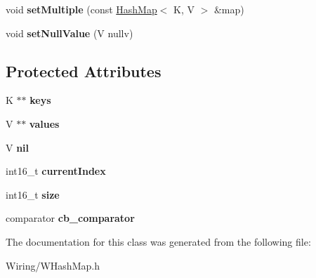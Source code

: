 \begin{DoxyCompactItemize}
\item 
\hypertarget{class_hash_map_ac5a8399ea019f8023bdad58a5c71f129}{}void {\bfseries set\+Multiple} (const \hyperlink{class_hash_map}{Hash\+Map}$<$ K, V $>$ \&map)\label{class_hash_map_ac5a8399ea019f8023bdad58a5c71f129}

\item 
\hypertarget{class_hash_map_acb737f38a458ac98ad1c01400ea8b572}{}void {\bfseries set\+Null\+Value} (V nullv)\label{class_hash_map_acb737f38a458ac98ad1c01400ea8b572}

\end{DoxyCompactItemize}
\subsection*{Protected Attributes}
\begin{DoxyCompactItemize}
\item 
\hypertarget{class_hash_map_a655e048c02f3bdbc0c3f300d5a73ab88}{}K $\ast$$\ast$ {\bfseries keys}\label{class_hash_map_a655e048c02f3bdbc0c3f300d5a73ab88}

\item 
\hypertarget{class_hash_map_a5811d197090726d10507a6189ce18873}{}V $\ast$$\ast$ {\bfseries values}\label{class_hash_map_a5811d197090726d10507a6189ce18873}

\item 
\hypertarget{class_hash_map_af2b76f3bd067749d61fd1ffd8eeee4a5}{}V {\bfseries nil}\label{class_hash_map_af2b76f3bd067749d61fd1ffd8eeee4a5}

\item 
\hypertarget{class_hash_map_aa2a734a0037110e66fc763a5be567bfa}{}int16\+\_\+t {\bfseries current\+Index}\label{class_hash_map_aa2a734a0037110e66fc763a5be567bfa}

\item 
\hypertarget{class_hash_map_a485fb8ca016d231e33181dc80a0ac796}{}int16\+\_\+t {\bfseries size}\label{class_hash_map_a485fb8ca016d231e33181dc80a0ac796}

\item 
\hypertarget{class_hash_map_aa81d7fa34e94848ae00b257e5f74cd3d}{}comparator {\bfseries cb\+\_\+comparator}\label{class_hash_map_aa81d7fa34e94848ae00b257e5f74cd3d}

\end{DoxyCompactItemize}


The documentation for this class was generated from the following file\+:\begin{DoxyCompactItemize}
\item 
Wiring/W\+Hash\+Map.\+h\end{DoxyCompactItemize}
